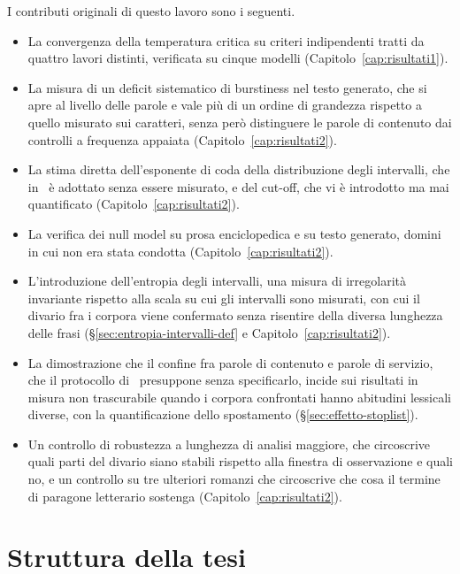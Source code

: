 I contributi originali di questo lavoro sono i seguenti.

\begin{itemize}
  \item La convergenza della temperatura critica su criteri indipendenti tratti
    da quattro lavori distinti, verificata su cinque modelli
    (Capitolo~\ref{cap:risultati1}).
  \item La misura di un deficit sistematico di burstiness nel testo generato,
    che si apre al livello delle parole e vale più di un ordine di grandezza
    rispetto a quello misurato sui caratteri, senza però distinguere le parole
    di contenuto dai controlli a frequenza appaiata
    (Capitolo~\ref{cap:risultati2}).
  \item La stima diretta dell'esponente di coda della distribuzione degli
    intervalli, che in~\cite{altmann2012} è adottato senza essere misurato, e
    del cut-off, che vi è introdotto ma mai quantificato
    (Capitolo~\ref{cap:risultati2}).
  \item La verifica dei null model su prosa enciclopedica e su testo generato,
    domini in cui non era stata condotta (Capitolo~\ref{cap:risultati2}).
  \item L'introduzione dell'entropia degli intervalli, una misura di
    irregolarità invariante rispetto alla scala su cui gli intervalli sono
    misurati, con cui il divario fra i corpora viene confermato senza risentire
    della diversa lunghezza delle frasi (§\ref{sec:entropia-intervalli-def} e
    Capitolo~\ref{cap:risultati2}).
  \item La dimostrazione che il confine fra parole di contenuto e parole di
    servizio, che il protocollo di~\cite{altmann2012} presuppone senza
    specificarlo, incide sui risultati in misura non trascurabile quando i
    corpora confrontati hanno abitudini lessicali diverse, con la
    quantificazione dello spostamento (§\ref{sec:effetto-stoplist}).
  \item Un controllo di robustezza a lunghezza di analisi maggiore, che
    circoscrive quali parti del divario siano stabili rispetto alla finestra di
    osservazione e quali no, e un controllo su tre ulteriori romanzi che
    circoscrive che cosa il termine di paragone letterario sostenga
    (Capitolo~\ref{cap:risultati2}).
\end{itemize}

\section{Struttura della tesi}
\label{sec:intro-struttura}

